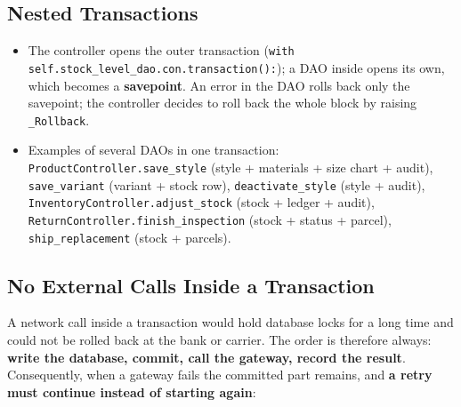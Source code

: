 \hypertarget{nested-transactions}{%
\subsection{Nested Transactions}\label{nested-transactions}}

\begin{itemize}
\tightlist
\item
  The controller opens the outer transaction
  (\texttt{with self.\allowbreak{}stock\_\allowbreak{}level\_\allowbreak{}dao.\allowbreak{}con.\allowbreak{}transaction(\allowbreak{}):}); a DAO
  inside opens its own, which becomes a \textbf{savepoint}. An error in
  the DAO rolls back only the savepoint; the controller decides to roll
  back the whole block by raising \texttt{\_\allowbreak{}Rollback}.
\item
  Examples of several DAOs in one transaction:
  \texttt{ProductController.\allowbreak{}save\_\allowbreak{}style} (style + materials + size chart
  + audit), \texttt{save\_\allowbreak{}variant} (variant + stock row),
  \texttt{deactivate\_\allowbreak{}style} (style + audit),
  \texttt{InventoryController.\allowbreak{}adjust\_\allowbreak{}stock} (stock + ledger + audit),
  \texttt{ReturnController.\allowbreak{}finish\_\allowbreak{}inspection} (stock + status +
  parcel), \texttt{ship\_\allowbreak{}replacement} (stock + parcels).
\end{itemize}

\hypertarget{sec:impl-noexternal}{%
\subsection{No External Calls Inside a
Transaction}\label{sec:impl-noexternal}}

A network call inside a transaction would hold database locks for a long
time and could not be rolled back at the bank or carrier. The order is
therefore always: \textbf{write the database, commit, call the gateway,
record the result}. Consequently, when a gateway fails the committed
part remains, and \textbf{a retry must continue instead of starting
again}:

